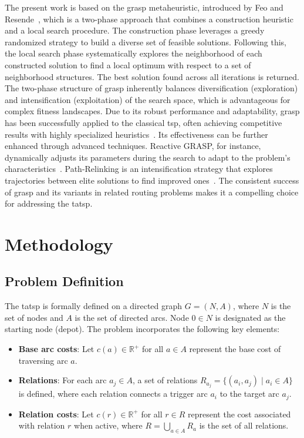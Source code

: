 \documentclass[twocolumn]{article} %
\begin{document}
The present work is based on the \gls{grasp} metaheuristic, introduced by Feo and Resende~\cite{Feo1995}, which is a two-phase approach that combines a construction heuristic and a local search procedure.
The construction phase leverages a greedy randomized strategy to build a diverse set of feasible solutions. Following this, the local search phase systematically explores the neighborhood of each constructed solution to find a local optimum with respect to a set of neighborhood structures.
The best solution found across all iterations is returned. The two-phase structure of \gls{grasp} inherently balances diversification (exploration) and intensification (exploitation) of the search space, which is advantageous for complex fitness landscapes.
Due to its robust performance and adaptability, \gls{grasp} has been successfully applied to the classical \gls{tsp}, often achieving competitive results with highly specialized heuristics~\cite{Oliveira2004}. 
Its effectiveness can be further enhanced through advanced techniques. Reactive GRASP, for instance, dynamically adjusts its parameters during the search to adapt to the problem's characteristics~\cite{Prais2000}. 
Path-Relinking is an intensification strategy that explores trajectories between elite solutions to find improved ones~\cite{Resende2019}. The consistent success of \gls{grasp} and its variants in related routing problems makes it a compelling choice for addressing the \gls{tatsp}.

\section{Methodology}

\subsection{Problem Definition}

The \gls{tatsp} is formally defined on a directed graph $G = (N, A)$, where $N$ is the set of nodes and $A$ is the set of directed arcs. Node $0 \in N$ is designated as the starting node (depot). The problem incorporates the following key elements:

\begin{itemize}
\item \textbf{Base arc costs}: Let $c(a) \in \mathbb{R}^+$ for all $a \in A$ represent the base cost of traversing arc $a$.
\item \textbf{Relations}: For each arc $a_j \in A$, a set of relations $R_{a_j} = \{(a_i, a_j) \mid a_i \in A\}$ is defined, where each relation connects a trigger arc $a_i$ to the target arc $a_j$.
\item \textbf{Relation costs}: Let $c(r) \in \mathbb{R}^+$ for all $r \in R$ represent the cost associated with relation $r$ when active, where $R = \bigcup_{a \in A} R_a$ is the set of all relations.
\end{itemize}
\end{document}
